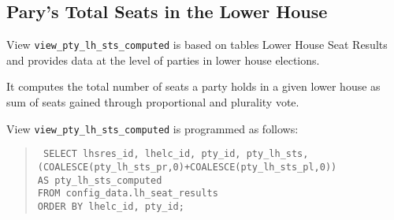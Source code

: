 \subsection{Pary's Total Seats in the Lower House}\label{view_pty_lh_sts_computed}
View \texttt{\footnotesize view\_pty\_lh\_sts\_computed} is based on tables Lower House Seat Results and provides data at the level of parties in lower house elections.

It computes the total number of seats a party holds in a given lower house as sum of seats gained through proportional and plurality vote.

View \texttt{\footnotesize view\_pty\_lh\_sts\_computed} is programmed as follows:
\begin{quote}
\texttt{\footnotesize
SELECT lhsres\_id, lhelc\_id, pty\_id, pty\_lh\_sts, \\
(COALESCE(pty\_lh\_sts\_pr,0)+COALESCE(pty\_lh\_sts\_pl,0))  \\
AS pty\_lh\_sts\_computed \\
FROM config\_data.lh\_seat\_results \\
ORDER BY lhelc\_id, pty\_id;
}\end{quote}

